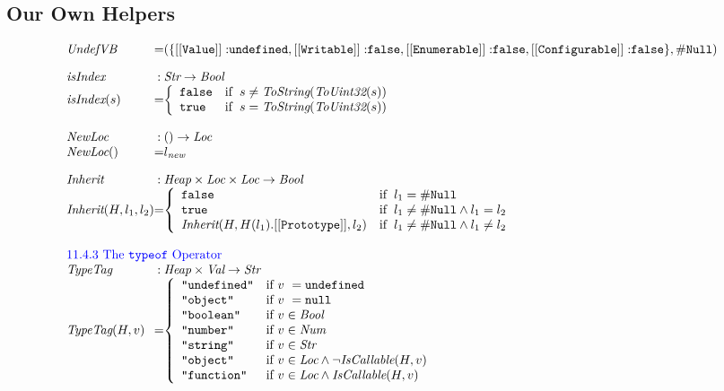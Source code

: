\documentclass[a4paper, leqno]{amsart}
\def\inblue{\color{blue}}
\newcommand{\UndefVB}{\emph{UndefVB}}
\newcommand{\nullK}{{\tt null}}
\newcommand{\nullL}{{\tt \#Null}}
\newcommand{\undef}{{\tt undefined}}
\newcommand{\false}{{\tt false}}
\newcommand{\true}{{\tt true}}
\newcommand{\Bool}{\emph{Bool}}
\newcommand{\Val}{\emph{Val}}
\newcommand{\Loc}{\emph{Loc}}
\newcommand{\Str}{\emph{Str}}
\newcommand{\Num}{\emph{Num}}
\newcommand{\Heap}{\emph{Heap}}
\newcommand{\hf}[1]{\emph{#1}}
\newcommand{\ifc}[1]{{\rm if}\begin{array}[t]{l}#1\end{array}}
\def\inblue{\color{blue}}
\begin{document}
\subsection{Our Own Helpers}
\[
\begin{array}{l@{}c@{}l}
\UndefVB &=& (\{{\tt [[Value]]:} \undef,
{\tt [[Writable]]:} \false,
{\tt [[Enumerable]]:} \false,
{\tt [[Configurable]]:} \false\}, \nullL)
\\[1em]
\hf{isIndex} & : & \Str \rightarrow \Bool \\
\hf{isIndex}(s) &=&
\left\{\begin{array}{ll}
\false& \ifc{s \not= \hf{ToString}(\hf{ToUint32}(s))}\\
\true& \ifc{s = \hf{ToString}(\hf{ToUint32}(s))}\\
\end{array}\right.
\\\\

\hf{NewLoc} & :& () \rightarrow \Loc \\
\hf{NewLoc}() &=& l_{\emph{new}}
\\[1em]
\hf{Inherit}&:& \Heap \times \Loc \times \Loc \rightarrow \Bool \\
\hf{Inherit}(H, l_1, l_2) &=&
\left\{\begin{array}{ll}
\false& \ifc{l_1 = \nullL}\\
\true& \ifc{l_1 \not= \nullL\wedge l_1 = l_2}\\
\hf{Inherit}(H,H(l_1).{\tt [[Prototype]]},l_2) & \ifc{l_1 \not= \nullL\wedge l_1 \not= l_2}\\
\end{array}\right.
\\\\

\multicolumn{3}{l}{\mbox{\inblue 11.4.3 The {\tt typeof} Operator}}\\
\hf{TypeTag} & :& \Heap \times \Val \rightarrow \Str \\
\hf{TypeTag}(H,v) &=&
\left\{ \begin{array}{ll}
\verb+"undefined"+ &\mbox{if $v\ = \undef$}\\
\verb+"object"+ &\mbox{if $v\ = \nullK$}\\
\verb+"boolean"+&\mbox{if $v\in\Bool$}\\
\verb+"number"+ &\mbox{if $v\in\Num$}\\
\verb+"string"+ &\mbox{if $v\in\Str$}\\
\verb+"object"+ &\mbox{if $v\in\Loc\wedge\neg\hf{IsCallable}(H,v)$}\\
\verb+"function"+ &\mbox{if $v\in\Loc\wedge\hf{IsCallable}(H,v)$}\\
\end{array}
\right.
\\[1em]


\end{array}\]
\end{document}
